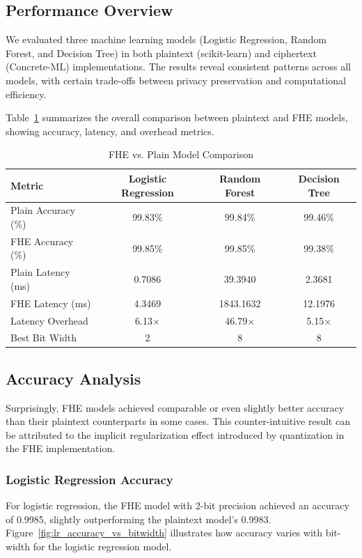 \documentclass[a4paper,12pt]{article}
\begin{document}
\subsection{Performance Overview}
We evaluated three machine learning models (Logistic Regression, Random Forest, and Decision Tree) in both plaintext (scikit-learn) and ciphertext (Concrete-ML) implementations. The results reveal consistent patterns across all models, with certain trade-offs between privacy preservation and computational efficiency.

Table~\ref{tab:overall_comparison} summarizes the overall comparison between plaintext and FHE models, showing accuracy, latency, and overhead metrics.

\begin{table}[h]
\caption{FHE vs. Plain Model Comparison}
\label{tab:overall_comparison}
\centering
\begin{tabular}{lccc}
\hline
\textbf{Metric} & \textbf{Logistic Regression} & \textbf{Random Forest} & \textbf{Decision Tree} \\
\hline
Plain Accuracy (\%) & 99.83\% & 99.84\% & 99.46\% \\
FHE Accuracy (\%) & 99.85\% & 99.85\% & 99.38\% \\
Plain Latency (ms) & 0.7086 & 39.3940 & 2.3681 \\
FHE Latency (ms) & 4.3469 & 1843.1632 & 12.1976 \\
Latency Overhead & 6.13× & 46.79× & 5.15× \\
Best Bit Width & 2 & 8 & 8 \\
\hline
\end{tabular}
\end{table}
    

\subsection{Accuracy Analysis}
Surprisingly, FHE models achieved comparable or even slightly better accuracy than their plaintext counterparts in some cases. This counter-intuitive result can be attributed to the implicit regularization effect introduced by quantization in the FHE implementation.

\subsubsection{Logistic Regression Accuracy}
For logistic regression, the FHE model with 2-bit precision achieved an accuracy of 0.9985, slightly outperforming the plaintext model's 0.9983. Figure~\ref{fig:lr_accuracy_vs_bitwidth} illustrates how accuracy varies with bit-width for the logistic regression model.
\end{document}
